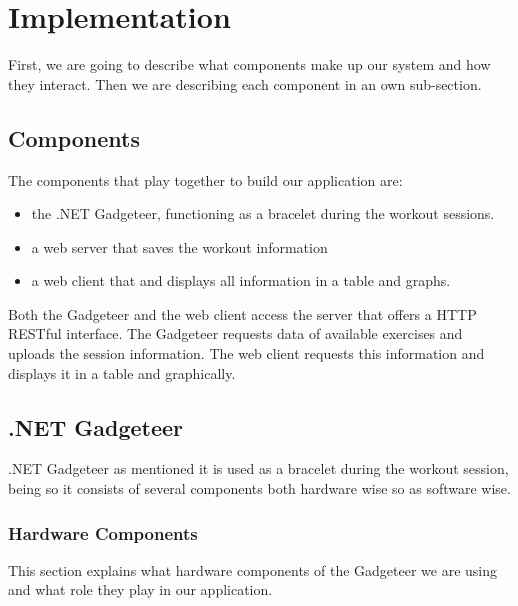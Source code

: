 \documentclass{tk3-team}
\begin{document}
\section{Implementation}

First, we are going to describe what components make up our system and how they interact. Then we are describing each component in an own sub-section.

\subsection{Components}
The components that play together to build our application are:
\begin{itemize}
	\item the .NET Gadgeteer, functioning as a bracelet during the workout sessions.
	\item a web server that saves the workout information 
	\item  a web client that and displays all information in a table and graphs.
\end{itemize}

Both the Gadgeteer and the web client access the server that offers a HTTP RESTful interface. The Gadgeteer requests data of available exercises  and uploads the session information. The web client requests this information and displays it in a table and graphically.

\subsection{.NET Gadgeteer}
.NET Gadgeteer as mentioned it is used as a bracelet during the workout session, being so it consists of several components both hardware wise so as software wise. 

\subsubsection{Hardware Components}

This section explains what hardware components of the Gadgeteer we are using and what role they play in our application.
\end{document}
